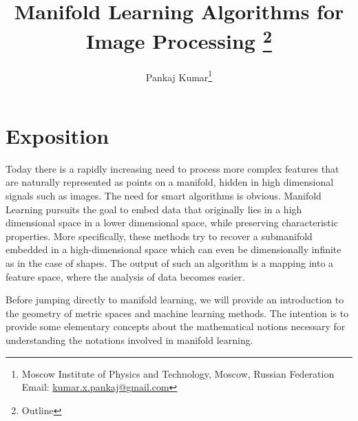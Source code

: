 \documentclass[12pt,a4paper]{article}
\title{Manifold Learning Algorithms for Image Processing \thanks{Outline} }
\author{Pankaj Kumar\thanks{Moscow Institute of Physics and Technology, Moscow, Russian Federation Email: \url{kumar.x.pankaj@gmail.com}}}
\date{}
\numberwithin{equation}{section}
\numberwithin{figure}{section}
\numberwithin{table}{section}
\begin{document}
\maketitle
%
\section{Exposition}

Today there is a rapidly increasing need to process more complex features that are naturally represented as points on a manifold, hidden in high dimensional signals such as images. The need for smart algorithms
is obvious. Manifold Learning pursuits the goal to embed data that originally lies in a high dimensional space in a lower dimensional space, while preserving characteristic properties. More specifically, these methods try
to recover a submanifold embedded in a high-dimensional space which can
even be dimensionally infinite as in the case of shapes. The output of such
an algorithm is a mapping into a feature space, where the analysis of data becomes easier. 

Before jumping directly to manifold learning, we will provide an introduction to the geometry of metric spaces and machine learning methods. The intention is to provide some elementary concepts about the mathematical notions necessary for understanding the notations involved in manifold learning.
\end{document}
